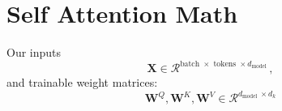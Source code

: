 \documentclass[12pt]{article}
\begin{document}
\section*{Self Attention Math}

Our inputs
$$
\mathbf{X} \in \mathcal{R}^{\text {batch } \times \text { tokens } \times d_{\text {model }}},
$$
and trainable weight matrices:
$$
\mathbf{W}^Q, \mathbf{W}^K, \mathbf{W}^V \in \mathcal{R}^{d_{\text {model }} \times d_k}
$$
\end{document}
